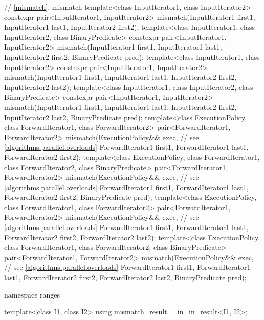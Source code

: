 \begin{codeblock}
{  // \ref{mismatch}, mismatch
  template<class InputIterator1, class InputIterator2>
    constexpr pair<InputIterator1, InputIterator2>
      mismatch(InputIterator1 first1, InputIterator1 last1,
               InputIterator2 first2);
  template<class InputIterator1, class InputIterator2, class BinaryPredicate>
    constexpr pair<InputIterator1, InputIterator2>
      mismatch(InputIterator1 first1, InputIterator1 last1,
               InputIterator2 first2, BinaryPredicate pred);
  template<class InputIterator1, class InputIterator2>
    constexpr pair<InputIterator1, InputIterator2>
      mismatch(InputIterator1 first1, InputIterator1 last1,
               InputIterator2 first2, InputIterator2 last2);
  template<class InputIterator1, class InputIterator2, class BinaryPredicate>
    constexpr pair<InputIterator1, InputIterator2>
      mismatch(InputIterator1 first1, InputIterator1 last1,
               InputIterator2 first2, InputIterator2 last2,
               BinaryPredicate pred);
  template<class ExecutionPolicy, class ForwardIterator1, class ForwardIterator2>
    pair<ForwardIterator1, ForwardIterator2>
      mismatch(ExecutionPolicy&& exec,                          // see \ref{algorithms.parallel.overloads}
               ForwardIterator1 first1, ForwardIterator1 last1,
               ForwardIterator2 first2);
  template<class ExecutionPolicy, class ForwardIterator1, class ForwardIterator2,
           class BinaryPredicate>
    pair<ForwardIterator1, ForwardIterator2>
      mismatch(ExecutionPolicy&& exec,                          // see \ref{algorithms.parallel.overloads}
               ForwardIterator1 first1, ForwardIterator1 last1,
               ForwardIterator2 first2, BinaryPredicate pred);
  template<class ExecutionPolicy, class ForwardIterator1, class ForwardIterator2>
    pair<ForwardIterator1, ForwardIterator2>
      mismatch(ExecutionPolicy&& exec,                          // see \ref{algorithms.parallel.overloads}
               ForwardIterator1 first1, ForwardIterator1 last1,
               ForwardIterator2 first2, ForwardIterator2 last2);
  template<class ExecutionPolicy, class ForwardIterator1, class ForwardIterator2,
           class BinaryPredicate>
    pair<ForwardIterator1, ForwardIterator2>
      mismatch(ExecutionPolicy&& exec,                          // see \ref{algorithms.parallel.overloads}
               ForwardIterator1 first1, ForwardIterator1 last1,
               ForwardIterator2 first2, ForwardIterator2 last2,
               BinaryPredicate pred);

  namespace ranges {
    template<class I1, class I2>
      using mismatch_result = in_in_result<I1, I2>;

}}
\end{codeblock}
